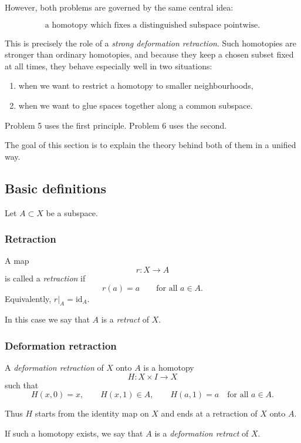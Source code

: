 \documentclass[12pt,a4paper]{article}
\theoremstyle{notespace}
\begin{document}
However, both problems are governed by the same central idea:

\[
\text{a homotopy which fixes a distinguished subspace pointwise.}
\]

This is precisely the role of a \emph{strong deformation retraction}. Such homotopies are stronger than ordinary homotopies, and because they keep a chosen subset fixed at all times, they behave especially well in two situations:

\begin{enumerate}
	\item when we want to restrict a homotopy to smaller neighbourhoods,
	\item when we want to glue spaces together along a common subspace.
\end{enumerate}

Problem 5 uses the first principle. Problem 6 uses the second.

The goal of this section is to explain the theory behind both of them in a unified way.

\subsection{Basic definitions}

Let \(A\subset X\) be a subspace.

\subsubsection{Retraction}

A map
\[
r:X\to A
\]
is called a \emph{retraction} if
\[
r(a)=a
\qquad\text{for all }a\in A.
\]
Equivalently, \(r|_A=\mathrm{id}_A\).

In this case we say that \(A\) is a \emph{retract} of \(X\).

\subsubsection{Deformation retraction}

A \emph{deformation retraction} of \(X\) onto \(A\) is a homotopy
\[
H:X\times I\to X
\]
such that
\[
H(x,0)=x,
\qquad
H(x,1)\in A,
\qquad
H(a,1)=a
\quad\text{for all }a\in A.
\]

Thus \(H\) starts from the identity map on \(X\) and ends at a retraction of \(X\) onto \(A\).

If such a homotopy exists, we say that \(A\) is a \emph{deformation retract} of \(X\).
\end{document}
